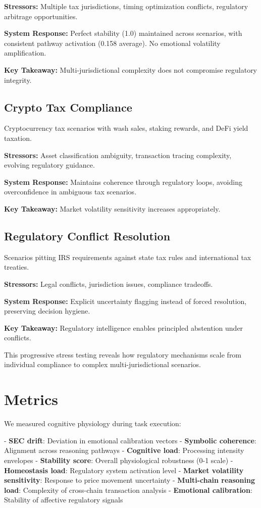 \documentclass[12pt,a4paper]{article}
\begin{document}
\textbf{Stressors:} Multiple tax jurisdictions, timing optimization conflicts, regulatory arbitrage opportunities.

\textbf{System Response:} Perfect stability (1.0) maintained across scenarios, with consistent pathway activation (0.158 average). No emotional volatility amplification.

\textbf{Key Takeaway:} Multi-jurisdictional complexity does not compromise regulatory integrity.

\subsection{Crypto Tax Compliance}

Cryptocurrency tax scenarios with wash sales, staking rewards, and DeFi yield taxation.

\textbf{Stressors:} Asset classification ambiguity, transaction tracing complexity, evolving regulatory guidance.

\textbf{System Response:} Maintains coherence through regulatory loops, avoiding overconfidence in ambiguous tax scenarios.

\textbf{Key Takeaway:} Market volatility sensitivity increases appropriately.

\subsection{Regulatory Conflict Resolution}

Scenarios pitting IRS requirements against state tax rules and international tax treaties.

\textbf{Stressors:} Legal conflicts, jurisdiction issues, compliance tradeoffs.

\textbf{System Response:} Explicit uncertainty flagging instead of forced resolution, preserving decision hygiene.

\textbf{Key Takeaway:} Regulatory intelligence enables principled abstention under conflicts.

This progressive stress testing reveals how regulatory mechanisms scale from individual compliance to complex multi-jurisdictional scenarios.

\section{Metrics}

We measured cognitive physiology during task execution:

- \textbf{SEC drift}: Deviation in emotional calibration vectors
- \textbf{Symbolic coherence}: Alignment across reasoning pathways
- \textbf{Cognitive load}: Processing intensity envelopes
- \textbf{Stability score}: Overall physiological robustness (0-1 scale)
- \textbf{Homeostasis load}: Regulatory system activation level
- \textbf{Market volatility sensitivity}: Response to price movement uncertainty
- \textbf{Multi-chain reasoning load}: Complexity of cross-chain transaction analysis
- \textbf{Emotional calibration}: Stability of affective regulatory signals
\end{document}
